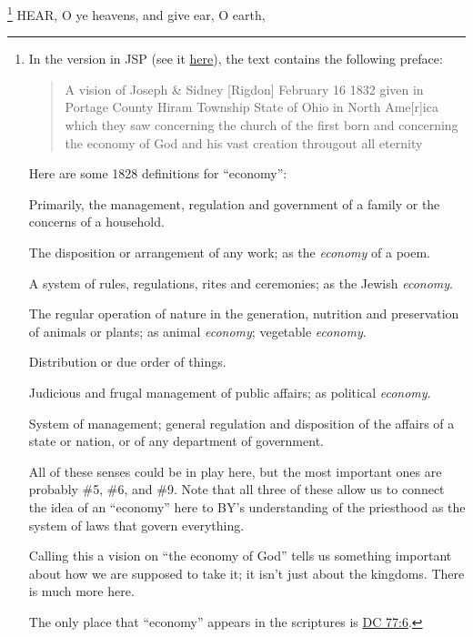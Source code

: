 			\footnote{%
				\label{DC76-1-economy}%
				In the version in JSP (see it \hyperref[EMS-1832-JS-16-FEB-1832]{here}), the text contains the following preface:
					\begin{quote}
						A vision of Joseph \& Sidney [Rigdon] February 16 1832 given in Portage County Hiram Township State of Ohio in North Ame[r]ica which they saw concerning the church of the first born and concerning the economy of God and his vast creation througout all eternity
					\end{quote}
				Here are some 1828 definitions for ``economy'':
					\begin{compactitem}
						\item[1] Primarily, the management, regulation and government of a family or the concerns of a household.
						\item[4] The disposition or arrangement of any work; as the \textit{economy} of a poem.
						\item[5] A system of rules, regulations, rites and ceremonies; as the Jewish \textit{economy}.
						\item[6] The regular operation of nature in the generation, nutrition and preservation of animals or plants; as animal \textit{economy}; vegetable \textit{economy}.
						\item[7] Distribution or due order of things.
						\item[8] Judicious and frugal management of public affairs; as political \textit{economy}.
						\item[9] System of management; general regulation and disposition of the affairs of a state or nation, or of any department of government.
					\end{compactitem}
				All of these senses could be in play here, but the most important ones are probably \#5, \#6, and \#9. Note that all three of these allow us to connect the idea of an ``economy'' here to BY's understanding of the priesthood as the system of laws that govern everything.
				
				Calling this a vision on ``the economy of God'' tells us something important about how we are supposed to take it; it isn't just about the kingdoms. There is much more here.
				
				The only place that ``economy'' appears in the scriptures is \hyperref[DC77-6]{DC 77:6}.
				}%
		HEAR, O ye heavens, and give ear, O earth,%
